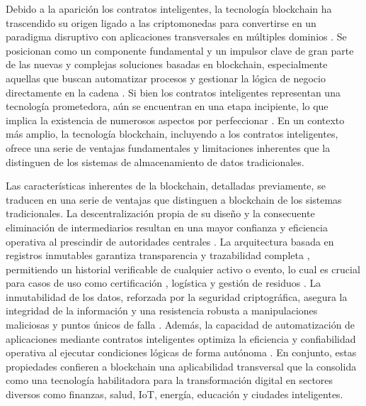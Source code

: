 Debido a la aparición los contratos inteligentes, la tecnología blockchain ha trascendido su origen ligado a las criptomonedas para convertirse en un paradigma disruptivo con aplicaciones transversales en múltiples dominios \cite{bartolomeo2020introduccion, vaigandla2023review}. Se posicionan como un componente fundamental y un impulsor clave de gran parte de las nuevas y complejas soluciones basadas en blockchain, especialmente aquellas que buscan automatizar procesos y gestionar la lógica de negocio directamente en la cadena \cite{sharabati2024blockchain}. Si bien los contratos inteligentes representan una tecnología prometedora, aún se encuentran en una etapa incipiente, lo que implica la existencia de numerosos aspectos por perfeccionar \cite{taherdoost2023smart}. En un contexto más amplio, la tecnología blockchain, incluyendo a los contratos inteligentes, ofrece una serie de ventajas fundamentales y limitaciones inherentes que la distinguen de los sistemas de almacenamiento de datos tradicionales.


Las características inherentes de la blockchain, detalladas previamente, se traducen en una serie de ventajas que distinguen a blockchain de los sistemas tradicionales. La descentralización propia de su diseño y la consecuente eliminación de intermediarios resultan en una mayor confianza \cite{rejeb2023role} y eficiencia operativa al prescindir de autoridades centrales \cite{sharabati2024blockchain}. La arquitectura basada en registros inmutables garantiza transparencia y trazabilidad completa \cite{sharabati2024blockchain}, permitiendo un historial verificable de cualquier activo o evento, lo cual es crucial para casos de uso como certificación \cite{bartolomeo2020introduccion}, logística \cite{bartolomeo2020introduccion, rejeb2023role} y gestión de residuos \cite{bulkowska2023implementation}. La inmutabilidad de los datos, reforzada por la seguridad criptográfica, asegura la integridad de la información \cite{sunny2022systematic} y una resistencia robusta a manipulaciones maliciosas y puntos únicos de falla \cite{bartolomeo2020introduccion}. Además, la capacidad de automatización de aplicaciones mediante contratos inteligentes optimiza la eficiencia y confiabilidad operativa al ejecutar condiciones lógicas de forma autónoma \cite{bartolomeo2020introduccion}. En conjunto, estas propiedades confieren a blockchain una aplicabilidad transversal que la consolida como una tecnología habilitadora para la transformación digital en sectores diversos como finanzas, salud, IoT, energía, educación y ciudades inteligentes.

